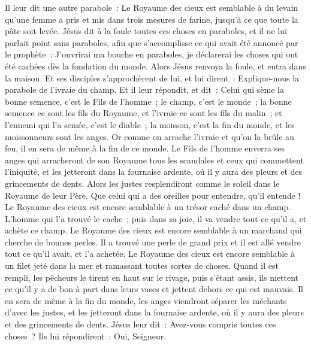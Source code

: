 \begin{multicols}{2}
Il leur dit une autre parabole~: Le Royaume des cieux est semblable à du levain qu'une femme a pris et mis dans trois mesures de farine, jusqu'à ce que toute la pâte soit levée.
Jésus dit à la foule toutes ces choses en paraboles, et il ne lui parlait point sans paraboles,
afin que s'accomplisse ce qui avait été annoncé par le prophète~: J'ouvrirai ma bouche en paraboles, je déclarerai les choses qui ont été cachées dès la fondation du monde.
Alors Jésus renvoya la foule, et entra dans la maison. Et ses disciples s'approchèrent de lui, et lui dirent~: Explique-nous la parabole de l'ivraie du champ.
Et il leur répondit, et dit~: Celui qui sème la bonne semence, c'est le Fils de l'homme~;
le champ, c'est le monde~; la bonne semence ce sont les fils du Royaume, et l'ivraie ce sont les fils du malin~;
et l'ennemi qui l'a semée, c'est le diable~; la moisson, c'est la fin du monde, et les moissonneurs sont les anges.
Or comme on arrache l'ivraie et qu'on la brûle au feu, il en sera de même à la fin de ce monde.
Le Fils de l'homme enverra ses anges qui arracheront de son Royaume tous les scandales et ceux qui commettent l'iniquité,
et les jetteront dans la fournaise ardente, où il y aura des pleurs et des grincements de dents.
Alors les justes resplendiront comme le soleil dans le Royaume de leur Père. Que celui qui a des oreilles pour entendre, qu'il entende !
Le Royaume des cieux est encore semblable à un trésor caché dans un champ. L'homme qui l'a trouvé le cache~; puis dans sa joie, il va vendre tout ce qu'il a, et achète ce champ.
Le Royaume des cieux est encore semblable à un marchand qui cherche de bonnes perles.
Il a trouvé une perle de grand prix et il est allé vendre tout ce qu'il avait, et l'a achetée.
Le Royaume des cieux est encore semblable à un filet jeté dans la mer et ramassant toutes sortes de choses.
Quand il est rempli, les pêcheurs le tirent en haut sur le rivage, puis s'étant assis, ils mettent ce qu'il y a de bon à part dans leurs vases et jettent dehors ce qui est mauvais.
Il en sera de même à la fin du monde, les anges viendront séparer les méchants d'avec les justes,
et les jetteront dans la fournaise ardente, où il y aura des pleurs et des grincements de dents.
Jésus leur dit~: Avez-vous compris toutes ces choses~? Ils lui répondirent~: Oui, Seigneur.

\end{multicols}
